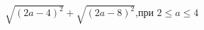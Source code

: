 \begin{ex}[type=calculate_expression]
	\begin{condition}
		\( \sqrt{(2a-4)^2}+\sqrt{(2a-8)^2} \),\quad при \( 2\le a \le4 \)
	\end{condition}
\end{ex}